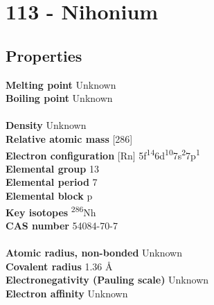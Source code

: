 \section{113 - Nihonium}
\label{sec:elem-nihonium}
\subsection{Properties}
\textbf{Melting point} Unknown\\
\textbf{Boiling point} Unknown\\
\\
\textbf{Density} Unknown\\
\textbf{Relative atomic mass} [286]\\
\textbf{Electron configuration} [Rn] 5f\textsuperscript{14}6d\textsuperscript{10}7s\textsuperscript{2}7p\textsuperscript{1} \\
\textbf{Elemental group} 13\\
\textbf{Elemental period} 7\\
\textbf{Elemental block} p\\
\textbf{Key isotopes} \textsuperscript{286}Nh\\
\textbf{CAS number} 54084-70-7\\
\\
\textbf{Atomic radius, non-bonded} Unknown\\
\textbf{Covalent radius} 1.36 Å\\
\textbf{Electronegativity (Pauling scale)} Unknown\\
\textbf{Electron affinity} Unknown\\